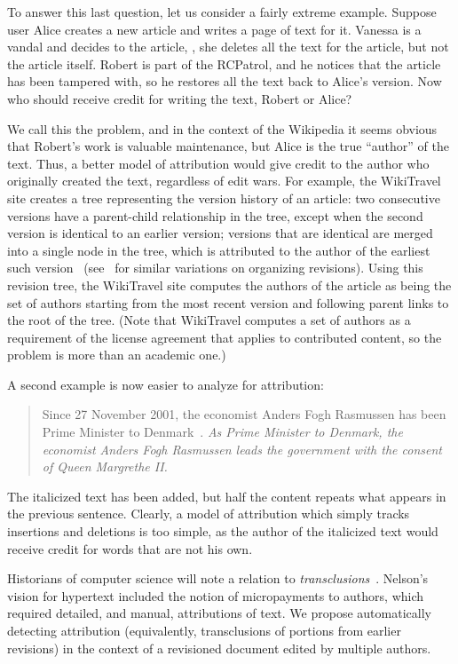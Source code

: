 To answer this last question, let us consider a fairly extreme example.
Suppose user Alice creates a new article and writes a page of text for it.
Vanessa is a vandal and decides to  the article,
\ie, she deletes all the text for the article, but not the article itself.
Robert is part of the RCPatrol, and he notices that the article has
been tampered with, so he restores all the text back to Alice's version.
Now who should receive credit for writing the text, Robert or Alice?

We call this the  problem,
and in the context of the Wikipedia it seems obvious that Robert's
work is valuable maintenance, but Alice is the true ``author'' of the text.
Thus, a better model of attribution would give credit
to the author who originally created the text,
regardless of edit wars.
For example, the WikiTravel site creates a tree representing
the version history of an article: two consecutive versions
have a parent-child relationship in the tree, except when
the second version is identical to an earlier version;
versions that are identical are merged into a single node
in the tree, which is attributed to the author of the earliest
such version~\cite{WikiTravelAuthorship}
(see~\cite{Ekstrand2009,Sabel2007} for similar variations
on organizing revisions).
Using this revision tree, the WikiTravel site computes the
authors of the article as being the set of authors starting
from the most recent version and following parent links
to the root of the tree.
(Note that WikiTravel computes a set of authors as a requirement
of the license agreement that applies to contributed content,
so the problem is more than an academic one.)


A second example is now easier to analyze for attribution:
%
\begin{quote}
Since 27 November 2001, the economist Anders Fogh Rasmussen
has been Prime Minister to Denmark~\cite{wiki:Denmark-Fogh}.
\textit{As Prime Minister to Denmark, the economist Anders Fogh Rasmussen
leads the government with the consent of Queen Margrethe II.}
\end{quote}
%
The italicized text has been added, but half the content repeats
what appears in the previous sentence.
Clearly, a model of attribution which simply tracks insertions
and deletions is too simple, as the author of the italicized
text would receive credit for words that are not his own.




Historians of computer science will note a relation
to \textit{transclusions}~\cite{Nelson81}.
Nelson's vision for hypertext included the notion
of micropayments to authors, which required detailed,
and manual, attributions of text.
We propose automatically detecting attribution
(equivalently, transclusions of portions from earlier revisions)
in the context of a revisioned document edited
by multiple authors.


